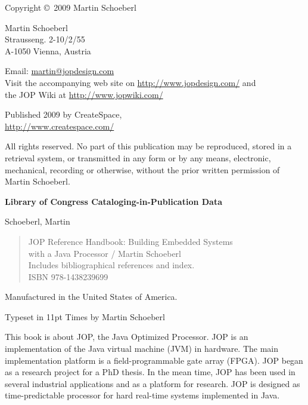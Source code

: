 \thispagestyle{empty}
\begin{flushleft}
{\small

Copyright \copyright \ 2009 Martin Schoeberl
\medskip

Martin Schoeberl\\
Strausseng. 2-10/2/55\\
A-1050 Vienna, Austria\\
\medskip

Email: \url{martin@jopdesign.com}\\
Visit the accompanying web site on \url{http://www.jopdesign.com/}
and\\
the JOP Wiki at \url{http://www.jopwiki.com/}
\medskip

Published 2009 by CreateSpace,\\
\url{http://www.createspace.com/}



\medskip


All rights reserved. No part of this publication may be reproduced,
stored in a retrieval system, or transmitted in any form or by any
means, electronic, mechanical, recording or otherwise, without the
prior written permission of Martin Schoeberl.
\medskip


\textbf{Library of Congress Cataloging-in-Publication Data}
\medskip

Schoeberl, Martin
\begin{quote}
    JOP Reference Handbook: Building Embedded Systems\\
    with a Java Processor / Martin Schoeberl\\
    Includes bibliographical references and index.\\
    ISBN 978-1438239699
\end{quote}

\bigskip


Manufactured in the United States of America.

Typeset in 11pt Times by Martin Schoeberl}
\end{flushleft}



This book is about JOP, the Java Optimized Processor. JOP is an
implementation of the Java virtual machine (JVM) in hardware. The
main implementation platform is a field-programmable gate array
(FPGA). JOP began as a research project for a PhD thesis. In the mean
time, JOP has been used in several industrial applications and as a
platform for research. JOP is designed as time-predictable processor
for hard real-time systems implemented in Java.

